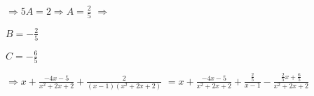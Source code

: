 $\Rightarrow 5A = 2 \Rightarrow A = \frac{2}{5}$
$ \Rightarrow $

$B = -\frac{2}{5}$

$C = -\frac{6}{5}$

$\Rightarrow x + \frac{-4x-5}{x^2+2x+2} + \frac{2}{(x-1)(x^2+2x+2)}$
$=  x + \frac{-4x-5}{x^2+2x+2} + \frac{\frac{2}{5}}{x-1} - \frac{\frac{2}{5}x+\frac{6}{5}}{x^2+2x+2}$

